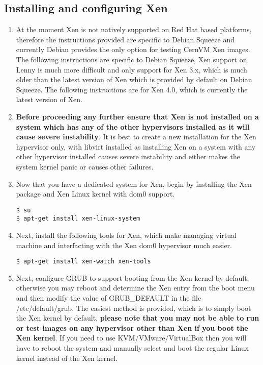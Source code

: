 \subsection{Installing and configuring Xen}
\label{sec:debianxen}
\begin{enumerate}

\item	At the moment Xen is not natively supported on Red Hat based platforms, therefore the instructions provided
			are specific to Debian Squeeze and currently Debian provides the only option for testing CernVM Xen images.
			The following instructions are specific to Debian Squeeze, Xen support on Lenny is much more difficult and
			only support for Xen 3.x, which is much older than the latest version of Xen which is provided by
			default on Debian Squeeze. The following instructions are for Xen 4.0, which is currently the latest version of
			Xen.
			
\item	{\bf Before proceeding any further ensure that Xen is not installed on a system which has any of the other 
			hypervisors installed as it will cause severe instability}. It is best to create a new installation for the Xen
			hypervisor only, with libvirt installed as installing Xen on a system with any other hypervisor installed
			causes severe instability and either makes the system kernel panic or causes other failures. 
			
\item	Now that you have a dedicated system for Xen, begin by installing the Xen package and Xen Linux 
			kernel with dom0 support.

\lstset{language=bash,caption=Installing Xen Package and Kernel}
\begin{lstlisting}
$ su
$ apt-get install xen-linux-system
\end{lstlisting}

\item	Next, install the following tools for Xen, which make managing virtual machine and interfacting with the Xen
			dom0 hypervisor much easier.

\lstset{language=bash,caption=Installing Xen Tools}
\begin{lstlisting}
$ apt-get install xen-watch xen-tools
\end{lstlisting}

\item 	Next, configure GRUB to support booting from the Xen kernel by default, otherwise you may reboot and determine
			the Xen entry from the boot menu and then modify the value of GRUB\_DEFAULT in the file /etc/default/grub. The
			easiest method is provided, which is to simply boot the Xen kernel by default, {\bf please note that you may not be
			able to run or test \cernvm images on any hypervisor other than Xen if you boot the Xen kernel}. If you need to use
			KVM/VMware/VirtualBox then you will have to reboot the system and manually select and boot the regular Linux
			kernel instead of the Xen kernel.
			

\end{enumerate}
